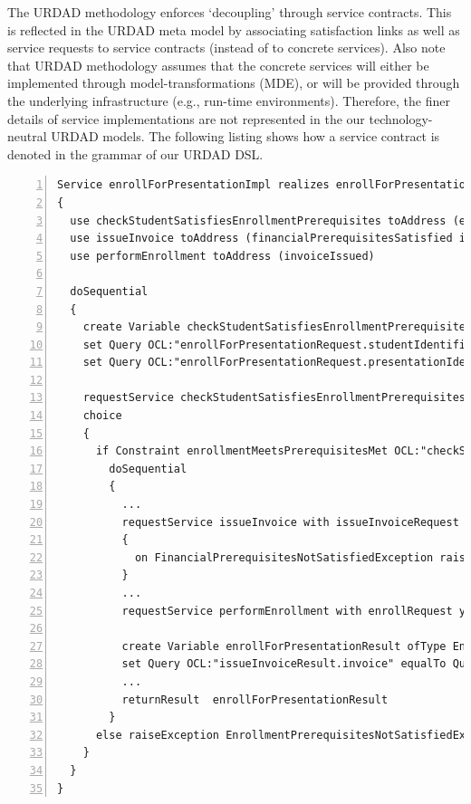 The URDAD methodology enforces `decoupling' through service contracts. This is reflected in the URDAD meta model by associating satisfaction links as well as service requests to service contracts (instead of to concrete services). Also note that URDAD methodology assumes that the concrete services will either be implemented through model-transformations (MDE), or will be provided through the underlying infrastructure (e.g., run-time environments). Therefore, the finer details of service implementations are not represented in the our technology-neutral URDAD models. The following listing shows how a service contract is denoted in the grammar of our URDAD DSL.

\lstset{language=urdad,caption=Specifying a service in the textual URDAD DSL syntax.,label=serviceTextSyntax}
\small \begin{lstlisting}[numbers=left,escapechar=|]
Service enrollForPresentationImpl realizes enrollForPresentation receiving Variable enrollForPresentationRequest ofType EnrollForPresentationRequest
{
  use checkStudentSatisfiesEnrollmentPrerequisites toAddress (enrollmentPrerequisitesMet)
  use issueInvoice toAddress (financialPrerequisitesSatisfied invoiceIssued) 
  use performEnrollment toAddress (invoiceIssued)
   
  doSequential
  {
    create Variable checkStudentSatisfiesEnrollmentPrerequisitesRequest ofType CheckStudentSatisfiesEnrollmentPrerequisitesRequest               
    set Query OCL:"enrollForPresentationRequest.studentIdentifier" equalTo Query OCL:"checkEnrollmentPrerequisitesRequest.studentIdentifier"
    set Query OCL:"enrollForPresentationRequest.presentationIdentifier" equalTo Query OCL:"checkEnrollmentPrerequisitesRequest.presentationIdentifier"
                     
    requestService checkStudentSatisfiesEnrollmentPrerequisites with checkStudentSatisfiesEnrollmentPrerequisitesRequest yielding Variable checkStudentSatisfiesEnrollmentPrerequisitesResult ofType CheckStudentSatisfiesEnrollmentPrerequisitesResult
    choice
    {
      if Constraint enrollmentMeetsPrerequisitesMet OCL:"checkStudentSatisfiesEnrollmentPrerequisitesResult.enrollmentPrerequisitesMet = true"
        doSequential
        {
          ...
          requestService issueInvoice with issueInvoiceRequest yielding Variable issueInvoiceResult ofType IssueInvoiceResult
          {
            on FinancialPrerequisitesNotSatisfiedException raiseException FinancialPrerequisitesNotSatisfiedException
          }
	      ...
          requestService performEnrollment with enrollRequest yielding Variable performEnrollmentResult ofType PerformEnrollmentResult
          
          create Variable enrollForPresentationResult ofType EnrollForPresentationResult
          set Query OCL:"issueInvoiceResult.invoice" equalTo Query OCL:"enrollForPresentationResult.invoice"
          ...                       
          returnResult  enrollForPresentationResult
        }
      else raiseException EnrollmentPrerequisitesNotSatisfiedException
    }
  }
}                 
\end{lstlisting}\normalsize

 
